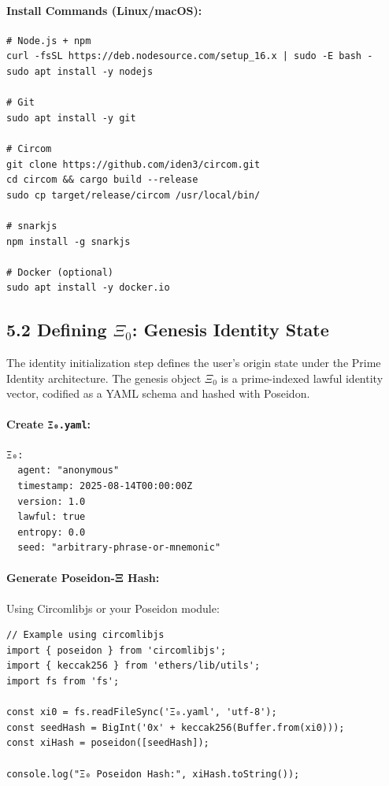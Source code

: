\documentclass[12]{amsart}
\theoremstyle{plain}
\begin{document}
\paragraph{Install Commands (Linux/macOS):}
\begin{verbatim}
# Node.js + npm
curl -fsSL https://deb.nodesource.com/setup_16.x | sudo -E bash -
sudo apt install -y nodejs

# Git
sudo apt install -y git

# Circom
git clone https://github.com/iden3/circom.git
cd circom && cargo build --release
sudo cp target/release/circom /usr/local/bin/

# snarkjs
npm install -g snarkjs

# Docker (optional)
sudo apt install -y docker.io
\end{verbatim}

\subsection{5.2 Defining \texorpdfstring{$\Xi_0$}{Ξ₀}: Genesis Identity State}
\label{subsec:define_xi0}

The identity initialization step defines the user's origin state under the Prime Identity architecture. The genesis object $\Xi_0$ is a prime-indexed lawful identity vector, codified as a YAML schema and hashed with Poseidon.

\paragraph{Create \texttt{Ξ₀.yaml}:}

\begin{verbatim}
Ξ₀:
  agent: "anonymous"
  timestamp: 2025-08-14T00:00:00Z
  version: 1.0
  lawful: true
  entropy: 0.0
  seed: "arbitrary-phrase-or-mnemonic"
\end{verbatim}

\paragraph{Generate Poseidon-Ξ Hash:}

Using Circomlibjs or your Poseidon module:

\begin{verbatim}
// Example using circomlibjs
import { poseidon } from 'circomlibjs';
import { keccak256 } from 'ethers/lib/utils';
import fs from 'fs';

const xi0 = fs.readFileSync('Ξ₀.yaml', 'utf-8');
const seedHash = BigInt('0x' + keccak256(Buffer.from(xi0)));
const xiHash = poseidon([seedHash]);

console.log("Ξ₀ Poseidon Hash:", xiHash.toString());
\end{verbatim}
\end{document}
